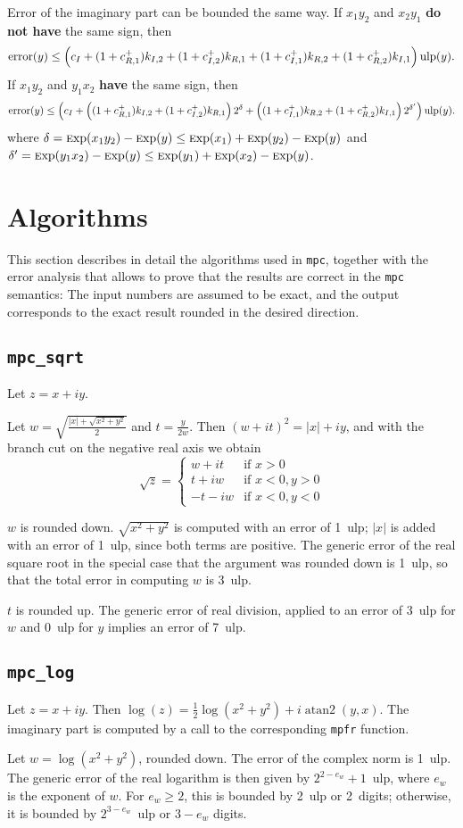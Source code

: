 \documentclass {article}
\newcommand {\mpc}{\texttt {mpc}}
\newcommand {\mpfr}{\texttt {mpfr}}
\newcommand {\ulp}[1]{#1~ulp}
\newcommand {\atantwo}{\operatorname {atan2}}
\DeclareMathOperator{\error}{error}
\newcommand {\Ulp}{{\rm ulp}}
\newcommand {\Exp}{{\rm \textsc exp}}
\begin{document}
Error of the imaginary part can be bounded the same way. If $x_1y_2$ and
$x_2y_1$ {\bf do not have} the same sign, then
\[
\error(y) \leq \left(c_I + (1+c_{R,1}^+)k_{I,2} + (1+c_{I,2}^+)k_{R,1} +
(1+c_{I,1}^+)k_{R,2} + (1+c_{R,2}^+)k_{I,1} \right) \Ulp(y).
\]
If $x_1y_2$ and $y_1x_2$ {\bf have} the same sign, then
\[
\error(y) \leq \left( c_I + \left( (1+c_{R,1}^+)k_{I,2} + (1+c_{I,2}^+)k_{R,1}
\right)2^{\delta} + \left( (1+c_{I,1}^+)k_{R,2} + (1+c_{R,2}^+)k_{I,1} \right)
2^{\delta'}\right) \Ulp(y).
\]
where $\delta = \Exp(x_1y_2)-\Exp(y) \leq \Exp(x_1)+\Exp(y_2)-\Exp(y)$ and
$\delta' = \Exp(y_1x_2)-\Exp(y) \leq \Exp(y_1)+\Exp(x_2)-\Exp(y)$.


\section {Algorithms}

This section describes in detail the algorithms used in \mpc, together with the error analysis that allows to prove that the results are correct in the {\mpc} semantics: The input numbers are assumed to be exact, and the output corresponds to the exact result rounded in the desired direction.


\subsection {\texttt {mpc\_sqrt}}

Let $z = x + i y$.

Let $w = \sqrt { \frac {|x| + \sqrt {x^2 + y^2}}{2}}$ and
$t = \frac {y}{2w}$. Then $(w + it)^2 = |x| + iy$, and with the branch cut on the negative real axis we obtain
\[
\sqrt z = \left\{
\begin {array}{cl}
w + i t & \text {if } x > 0 \\
t + i w & \text {if } x < 0, y > 0 \\
-t - i w & \text {if } x < 0, y < 0
\end {array}
\right.
\]

$w$ is rounded down. $\sqrt {x^2 + y^2}$ is computed with an error of \ulp{1}; $|x|$ is added with an error of \ulp{1}, since both terms are positive. The generic error of the real square root in the special case that the argument was rounded down is \ulp{1}, so that the total error in computing $w$ is \ulp{3}.

$t$ is rounded up. The generic error of real division, applied to an error of \ulp{3} for $w$ and \ulp{0} for $y$ implies an error of \ulp{7}.


\subsection {\texttt {mpc\_log}}

Let $z = x + i y$. Then $\log (z) = \frac {1}{2} \log (x^2 + y^2) + i \atantwo (y, x)$. The imaginary part is computed by a call to the corresponding {\mpfr} function.

Let $w = \log (x^2 + y^2)$, rounded down. The error of the complex norm is \ulp{1}. The generic error of the real logarithm is then given by \ulp{$2^{2 - e_w} + 1$}, where $e_w$ is the exponent of $w$. For $e_w \geq 2$, this is bounded by \ulp{2} or 2~digits; otherwise, it is bounded by \ulp{$2^{3 - e_w}$} or $3 - e_w$ digits.
\end{document}
